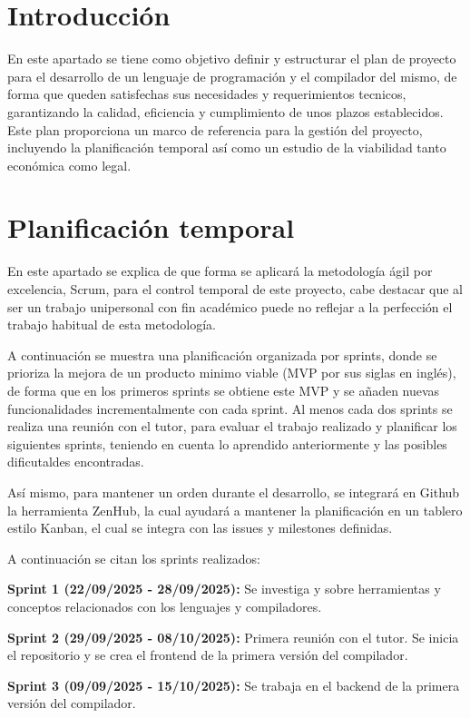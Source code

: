 
\section{Introducción}
En este apartado se tiene como objetivo definir y estructurar el plan de proyecto para el desarrollo de un lenguaje de programación y el compilador del mismo, de forma que queden satisfechas sus necesidades y requerimientos tecnicos, garantizando la calidad, eficiencia y cumplimiento de unos plazos establecidos. Este plan proporciona un marco de referencia para la gestión del proyecto, incluyendo la planificación temporal así como un estudio de la viabilidad tanto económica como legal.

\section{Planificación temporal}
En este apartado se explica de que forma se aplicará la metodología ágil por excelencia, Scrum, para el control temporal de este proyecto, cabe destacar que al ser un trabajo unipersonal con fin académico puede no reflejar a la perfección el trabajo habitual de esta metodología. 

A continuación se muestra una planificación organizada por sprints, donde se prioriza la mejora de un producto minimo viable (MVP por sus siglas en inglés), de forma que en los primeros sprints se obtiene este MVP y se añaden nuevas funcionalidades incrementalmente con cada sprint. Al menos cada dos sprints se realiza una reunión con el tutor, para evaluar el trabajo realizado y planificar los siguientes sprints, teniendo en cuenta lo aprendido anteriormente y las posibles dificutaldes encontradas.

Así mismo, para mantener un orden durante el desarrollo, se integrará en Github la herramienta ZenHub, la cual ayudará a mantener la planificación en un tablero estilo Kanban, el cual se integra con las issues y milestones definidas.

A continuación se citan los sprints realizados:

\textbf{Sprint 1 (22/09/2025 - 28/09/2025):} Se investiga y sobre herramientas y conceptos relacionados con los lenguajes y compiladores.

\textbf{Sprint 2 (29/09/2025 - 08/10/2025):} Primera reunión con el tutor. Se inicia el repositorio y se crea el frontend de la primera versión del compilador.

\textbf{Sprint 3 (09/09/2025 - 15/10/2025):} Se trabaja en el backend de la primera versión del compilador. 

